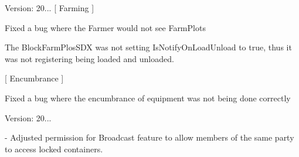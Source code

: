 Version\+: 20... \mbox{[} Farming \mbox{]}
\begin{DoxyItemize}
\item Fixed a bug where the Farmer would not see Farm\+Plots
\begin{DoxyItemize}
\item The Block\+Farm\+Plos\+SDX was not setting Is\+Notify\+On\+Load\+Unload to true, thus it was not registering being loaded and unloaded.
\end{DoxyItemize}
\end{DoxyItemize}

\mbox{[} Encumbrance \mbox{]}
\begin{DoxyItemize}
\item Fixed a bug where the encumbrance of equipment was not being done correctly
\end{DoxyItemize}

Version\+: 20... \begin{DoxyVerb}
    - Adjusted permission for Broadcast feature to allow members of the same party to access locked containers.
\end{DoxyVerb}


